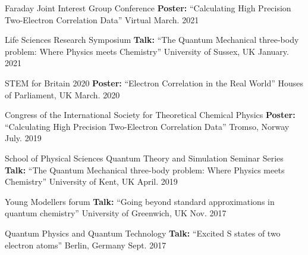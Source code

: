 


\begin{cventries}

\cvpresen
{Faraday Joint Interest Group Conference } %
{\textbf{Poster:} \normalfont``Calculating High Precision Two-Electron Correlation Data''} %
{Virtual} %
{March. 2021} %
{}

\cvpresen
{Life Sciences Research Symposium} %
{\textbf{Talk:} \normalfont``The Quantum Mechanical three-body problem: Where Physics meets Chemistry''} %
{University of Sussex, UK} %
{January. 2021} %
{}

\cvpresen
{STEM for Britain 2020} %
{\textbf{Poster:} \normalfont``Electron Correlation in the Real World''} %
{Houses of Parliament, UK} %
{March. 2020} %
{}

\cvpresen
{ Congress of the International Society for Theoretical Chemical Physics} %
{\textbf{Poster:} \normalfont``Calculating High Precision Two-Electron Correlation Data''} %
{Tromso, Norway} %
{July. 2019} %
{}

\cvpresen
{School of Physical Sciences Quantum Theory and Simulation Seminar Series} %
{\textbf{Talk:} \normalfont``The Quantum Mechanical three-body problem: Where Physics meets Chemistry''} %
{University of Kent, UK} %
{April. 2019} %
{}

\cvpresen
{Young Modellers forum} %
{\textbf{Talk:} \normalfont``Going beyond standard approximations in quantum chemistry''} %
{University of Greenwich, UK} %
{Nov. 2017} %
{}


\cvpresen
{Quantum Physics and Quantum Technology} %
{\textbf{Talk:} \normalfont``Excited S states of two electron atoms''} %
{Berlin, Germany} %
{Sept. 2017} %
{ %
}


\end{cventries}
